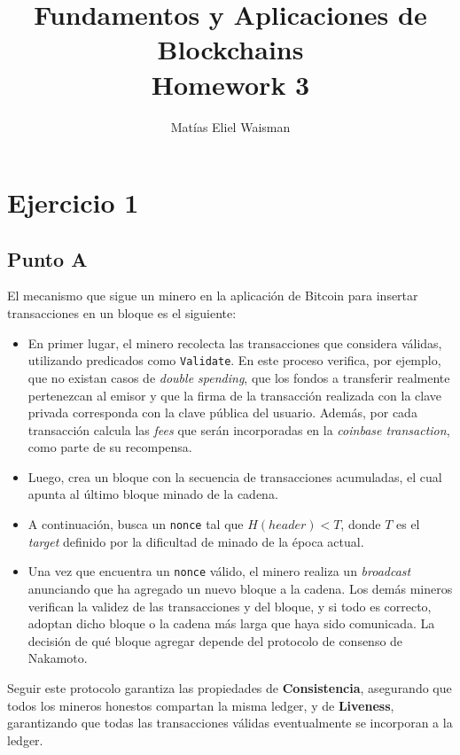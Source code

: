 \documentclass[12pt]{article}
\title{\fontsize{16}{18}\selectfont Fundamentos y Aplicaciones de Blockchains \\ Homework 3}
\author{Matías Eliel Waisman}
\date{}
\begin{document}
\maketitle

\section{Ejercicio 1}

\subsection{Punto A}

El mecanismo que sigue un minero en la aplicación de Bitcoin para insertar transacciones en un bloque es el siguiente:

\begin{itemize}
\item En primer lugar, el minero recolecta las transacciones que considera válidas, utilizando predicados como \texttt{Validate}. En este proceso verifica, por ejemplo, que no existan casos de \emph{double spending}, que los fondos a transferir realmente pertenezcan al emisor y que la firma de la transacción realizada con la clave privada corresponda con la clave pública del usuario. Además, por cada transacción calcula las \emph{fees} que serán incorporadas en la \emph{coinbase transaction}, como parte de su recompensa.

\item Luego, crea un bloque con la secuencia de transacciones acumuladas, el cual apunta al último bloque minado de la cadena.

\item A continuación, busca un \texttt{nonce} tal que $H(header) < T$, donde $T$ es el \emph{target} definido por la dificultad de minado de la época actual.

\item Una vez que encuentra un \texttt{nonce} válido, el minero realiza un \emph{broadcast} anunciando que ha agregado un nuevo bloque a la cadena. Los demás mineros verifican la validez de las transacciones y del bloque, y si todo es correcto, adoptan dicho bloque o la cadena más larga que haya sido comunicada. La decisión de qué bloque agregar depende del protocolo de consenso de Nakamoto.
\end{itemize}

Seguir este protocolo garantiza las propiedades de \textbf{Consistencia}, asegurando que todos los mineros honestos compartan la misma ledger, y de \textbf{Liveness}, garantizando que todas las transacciones válidas eventualmente se incorporan a la ledger.
\end{document}
